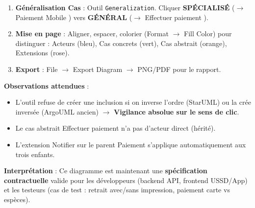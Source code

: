 \documentclass[11pt]{article}
\begin{document}
\begin{experience}
\begin{enumerate}
    \item \textbf{Généralisation Cas} : Outil \texttt{Generalization}. Cliquer \textbf{SPÉCIALISÉ} ($\rightarrow$ \guillemotleft Paiement Mobile \guillemotright) vers \textbf{GÉNÉRAL} ($\rightarrow$ \guillemotleft Effectuer paiement \guillemotright).
    \item \textbf{Mise en page} : Aligner, espacer, colorier (Format $\rightarrow$ Fill Color) pour distinguer : Acteurs (bleu), Cas concrets (vert), Cas abstrait (orange), Extensions (rose).
    \item \textbf{Export} : File $\rightarrow$ Export Diagram $\rightarrow$ PNG/PDF pour le rapport.
\end{enumerate}

\textbf{Observations attendues} :
\begin{itemize}
    \item L'outil refuse de créer une inclusion si on inverse l'ordre (StarUML) ou la crée inversée (ArgoUML ancien) $\rightarrow$ \textbf{Vigilance absolue sur le sens de clic}.
    \item Le cas abstrait \guillemotleft Effectuer paiement \guillemotright n'a pas d'acteur direct (hérité).
    \item L'extension \guillemotleft Notifier \guillemotright sur le parent \guillemotleft Paiement \guillemotright s'applique automatiquement aux trois enfants.
\end{itemize}

\textbf{Interprétation} : Ce diagramme est maintenant une \textbf{spécification contractuelle} valide pour les développeurs (backend API, frontend USSD/App) et les testeurs (cas de test : retrait avec/sans impression, paiement carte vs espèces).
\end{experience}
\end{document}
